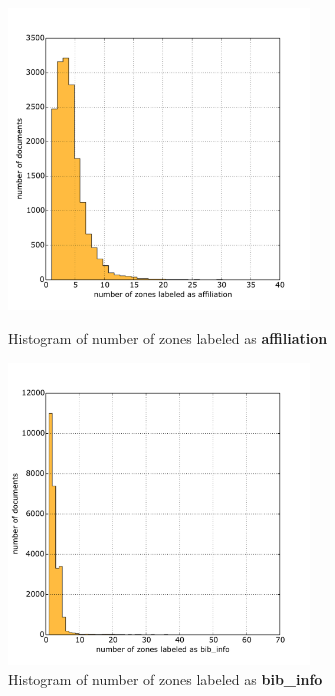 \begin{figure}[ht]
\centering
\begin{minipage}[t!]{0.48\linewidth}
  \includegraphics[width=8cm]{plots/affiliation_histogram}
  \caption{Histogram of number of zones labeled as \textbf{affiliation}}
  \label{fig:affiliation_histogram}
\end{minipage}
\quad
\begin{minipage}[t!]{0.48\linewidth}
  \includegraphics[width=8cm]{plots/bib_info_histogram}
  \caption{Histogram of number of zones labeled as \textbf{bib\_info}}
  \label{fig:bib_info_histogram}
\end{minipage}
\end{figure}

